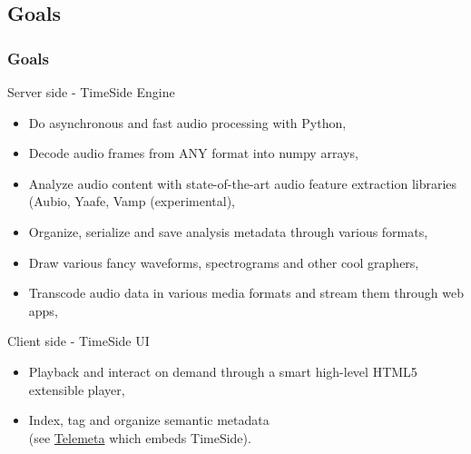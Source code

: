 \documentclass[final, hyperref, table]{beamer}
\begin{document}
\subsection{Goals}
\begin{frame}
 \frametitle{Goals}%
\begin{block}{Server side - TimeSide Engine}
  \begin{itemize}
  \footnotesize
  \item \alert{Do} asynchronous and fast audio processing with Python,
  \item \alert{Decode} audio frames from ANY format into numpy arrays,
  \item \alert{Analyze} audio content with state-of-the-art audio feature extraction libraries (Aubio, Yaafe, Vamp (experimental),
  \item  \alert{Organize}, serialize and save analysis metadata through various formats,
  \item  \alert{Draw} various fancy waveforms, spectrograms and other cool graphers,
  \item  \alert{Transcode} audio data in various media formats and stream them through web apps,
  \end{itemize}
 
\end{block}
\begin{block}{Client side - TimeSide UI}
  \begin{itemize}
  \footnotesize
  \item   \alert{Playback} and  \alert{interact} on demand through a smart high-level HTML5 extensible player,
  \item   \alert{Index},  \alert{tag} and  \alert{organize semantic metadata} \\
(see \href{http://telemeta.org/}{Telemeta} which embeds TimeSide).
  \end{itemize}
\end{block}
\end{frame} 
\end{document}
